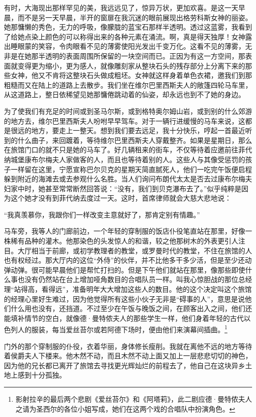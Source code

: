 \par 有时，大海现出那样罕见的美，我远远见了，惊异万状，更加欢喜。是这一天早晨，而不是另一天早晨，半开的窗扉在我沉迷的眼前展现出格劳科斯女神的丽姿。她那慵懒的秀色，无力的呼吸，像朦胧的蓝宝石那样半透明。透过这蓝雾，我看到了给她点染上颜色的可以称得出来的各种元素在涌流。啊，真是得天独厚！女神露出睡眼蒙的笑容，令肉眼看不见的薄雾使阳光发出千变万化。这看不见的薄雾，无非是在她那半透明的表面周围所保留的一块空间而已。正因为有这一方空间，那表面就变得更为缩小，更为感人，就像雕刻家从整块石头的残存部分上分离下来的那些女神，他又不肯将这整块石头做成粗坯。女神就这样身着单色衣裙，邀我们到那粗糙而又在陆上的道路上去散步。我们坐在维尔巴里西斯夫人的敞篷四轮马车里，从这道路上，整日依稀望见她那慵倦跳动着的仙姿，却永远也到不了她的身边。
\par 为了使我们有充足的时间或到圣马尔斯，或到格特奥尔姆山岩，或到别的什么郊游的地方去，维尔巴里西斯夫人吩咐早早驾车。对于一辆行进缓慢的马车来说，这都是很远的地方，要走上一整天。想到我们要去远足，我十分快乐，哼起一首最近听到的什么曲子，来回踱着，等待维尔巴里西斯夫人穿戴整齐。如果是星期日，那么在旅馆门口的就不只是她的马车了。好几辆租来的街车，不仅等待着应邀前往菲代纳城堡康布尔梅夫人家做客的人，而且也等待着别的人。这些人与其像受惩罚的孩子一样留在这里，宁愿宣称巴尔贝克的星期天简直腻死人，他们一吃完午饭便启程躲到附近的海滩去或去参观什么名胜。当人们询问布朗代太太是否去过康布尔梅夫妇家中时，她甚至常常断然回答说：“没有，我们到贝克瀑布去了。”似乎纯粹是因为这个她才没有到菲代纳去度过一天。这时，首席律师就会大慈大悲地说：
\par “我真羡慕你，我跟你们一样改变主意就好了，那肯定别有情趣。”
\par 马车旁，我等人的门廊前边，一个年轻的穿制服的饭店仆役笔直站在那里，好像一株稀有品种的灌木。他那染色的头发惊人的和谐，较之他那树木的外表更引人注目。大厅相当于前廊，或初学教理者的教堂，或罗曼时代的教堂，不住在旅馆的人也有权经过。那大厅内的这位“外侍”的伙伴，并不比他多干多少活，但是至少还动弹动弹。很可能早晨他们是帮忙打扫的。但是下午他们就站在那里，像那些即使什么事也没有仍然站在台上增加哑角数目的合唱队员一样。叫我心惊胆战的那位总经理“站得高，看得远”，准备明年大大增加这些人的数目。他的这个决定叫这个旅馆的经理心里好生难过，因为他觉得所有这些小伙子无非是“碍事的人”，意思是说他们什么用也没有，还挡道。不过至少在午饭与晚饭之间，在顾客出入之间，他们还能填补情节的空白，就像德·曼特侬夫人的那些学生一样，他们身着年轻的古代以色列人的服装，每当爱丝苔尔或若阿德下场时，便由他们来演幕间插曲。\footnote{影射拉辛的最后两个悲剧《爱丝苔尔》和《阿塔莉》，此二剧应德·曼特侬夫人之请为圣西尔的各位小姐写成，她们在这两个戏的合唱队中扮演角色。}
\par 门外的那个穿制服的仆役，衣着华丽，身体修长瘦削。我就在离他不远的地方等待着侯爵夫人下楼来。他木然不动，而且木然不动上面又加上一层悲悲切切的神色，因为他的兄长都已离开了旅馆去寻找更光辉灿烂的前程去了，他自己在这块异乡土地上感到十分孤独。
